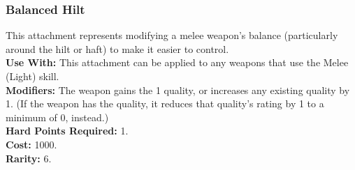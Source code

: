 \subsubsection{Balanced Hilt}
This attachment represents modifying a melee weapon’s
balance (particularly around the hilt or haft) to make it
easier to control.\\
\textbf{Use With:} This attachment can be applied to any
    weapons that use the Melee (Light) skill.\\
\textbf{Modifiers:} The weapon gains the
     1 quality, or increases any
    existing  quality by 1.
    (If the weapon has the  quality,
    it reduces that quality's rating by 1 to a minimum of 0,
    instead.)\\
\textbf{Hard Points Required:} 1.\\
\textbf{Cost:} 1000.\\
\textbf{Rarity:} 6.\\
